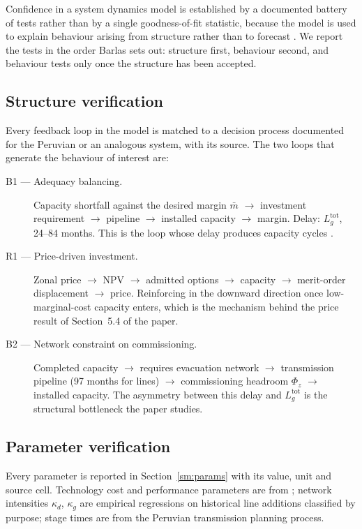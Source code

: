 \documentclass[11pt]{article}
\begin{document}
Confidence in a system dynamics model is established by a documented battery of
tests rather than by a single goodness-of-fit statistic, because the model is used
to explain behaviour arising from structure rather than to forecast
\citep{barlas1996,oliva2004,richardson2024}. We report the tests in the order
Barlas sets out: structure first, behaviour second, and behaviour tests only once
the structure has been accepted.

\subsection{Structure verification}

Every feedback loop in the model is matched to a decision process documented for
the Peruvian or an analogous system, with its source. The two loops that generate
the behaviour of interest are:

\begin{description}
  \item[B1 --- Adequacy balancing.] Capacity shortfall against the desired margin
    $\bar m$ $\rightarrow$ investment requirement $\rightarrow$ pipeline
    $\rightarrow$ installed capacity $\rightarrow$ margin. Delay: $L^{\text{tot}}_g$,
    24--84 months. This is the loop whose delay produces capacity cycles
    \citep{ford2001,assili2008}.
  \item[R1 --- Price-driven investment.] Zonal price $\rightarrow$ NPV
    $\rightarrow$ admitted options $\rightarrow$ capacity $\rightarrow$ merit-order
    displacement $\rightarrow$ price. Reinforcing in the downward direction once
    low-marginal-cost capacity enters, which is the mechanism behind the price
    result of Section~5.4 of the paper.
  \item[B2 --- Network constraint on commissioning.] Completed capacity
    $\rightarrow$ requires evacuation network $\rightarrow$ transmission pipeline
    (97 months for lines) $\rightarrow$ commissioning headroom $\Phi_z$
    $\rightarrow$ installed capacity. The asymmetry between this delay and
    $L^{\text{tot}}_g$ is the structural bottleneck the paper studies.
\end{description}

\subsection{Parameter verification}

Every parameter is reported in Section~\ref{sm:params} with its value, unit and
source cell. Technology cost and performance parameters are from \citet{nrel2024};
network intensities $\kappa_d$, $\kappa_g$ are empirical regressions on historical
line additions classified by purpose; stage times are from the Peruvian
transmission planning process.
\end{document}
